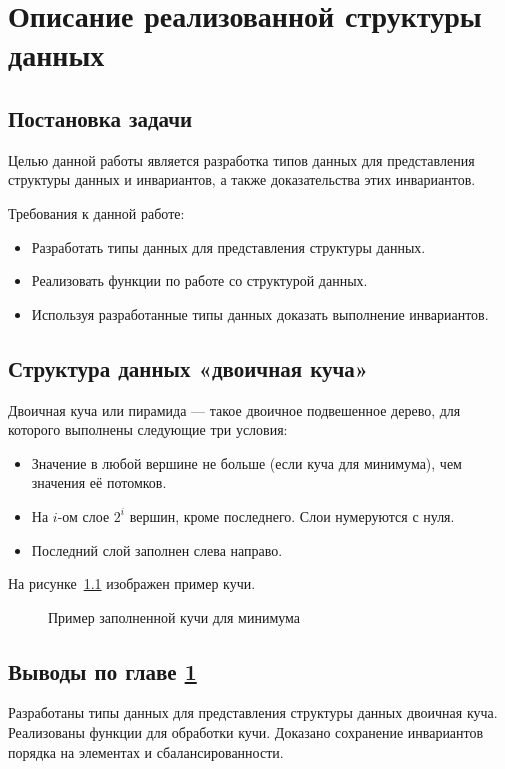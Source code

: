 \chapter{Описание реализованной структуры данных}
\label{chapter2}

\section{Постановка задачи}
Целью данной работы является разработка типов данных для представления
структуры данных и инвариантов, а также доказательства этих инвариантов.

Требования к данной работе:
\begin{itemize}
 \item Разработать типы данных для представления структуры данных.
 \item Реализовать функции по работе со структурой данных.
 \item Используя разработанные типы данных доказать выполнение инвариантов.
\end{itemize}

\section{Структура данных «двоичная куча»}

\begin{definition}
Двоичная куча или пирамида \cite{DBLP:books/mg/CormenLRS01} — такое двоичное подвешенное дерево, для которого выполнены следующие три условия:
\begin{itemize}
 \item Значение в любой вершине не больше (если куча для минимума), чем значения её потомков.
 \item На $i$-ом слое $2^i$ вершин, кроме последнего. Слои нумеруются с нуля.
 \item Последний слой заполнен слева направо. %
\end{itemize}
\end{definition}
На рисунке~\ref{pic:min-heap} изображен пример кучи.
\begin{figure}[h!]
  \caption{Пример заполненной кучи для минимума}
  \label{pic:min-heap}
\end{figure} 


\section{Выводы по главе \ref{chapter2}}

Разработаны типы данных для представления структуры данных двоичная куча.
Реализованы функции для обработки кучи.
Доказано сохранение инвариантов порядка на элементах и сбалансированности.
